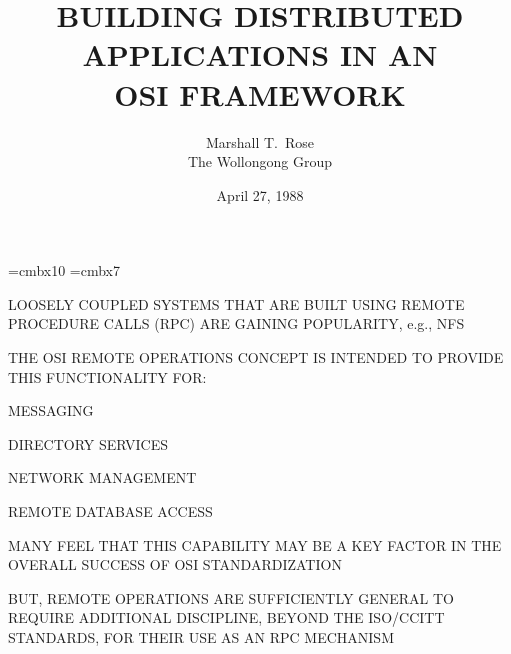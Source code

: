 

\def\emph#1{\underline{#1}}		

\font\xx=cmbx10
\font\yy=cmbx7

\raggedright



\title	{BUILDING DISTRIBUTED\\ APPLICATIONS IN AN\\ OSI FRAMEWORK}
\author	{Marshall T.~Rose\\ The Wollongong Group}
\date	{April 27, 1988}
\maketitlepage


\begin{bwslide}

\begin{nrtc}
\item	LOOSELY COUPLED SYSTEMS THAT ARE BUILT USING REMOTE PROCEDURE CALLS
	(RPC) ARE GAINING POPULARITY, e.g., NFS

\item	THE OSI REMOTE OPERATIONS CONCEPT IS INTENDED TO PROVIDE THIS
	FUNCTIONALITY FOR:
    \begin{nrtc}
    \item	MESSAGING

    \item	DIRECTORY SERVICES

    \item	NETWORK MANAGEMENT

    \item	REMOTE DATABASE ACCESS
    \end{nrtc}
\end{nrtc}
\end{bwslide}


\begin{bwslide}

\begin{nrtc}
\item	MANY FEEL THAT THIS CAPABILITY MAY BE A KEY FACTOR IN THE OVERALL
	SUCCESS OF OSI STANDARDIZATION

\item	BUT, REMOTE OPERATIONS ARE SUFFICIENTLY GENERAL TO REQUIRE
	ADDITIONAL DISCIPLINE, BEYOND THE ISO/CCITT STANDARDS,
	FOR THEIR USE AS AN RPC MECHANISM
\end{nrtc}
\end{bwslide}


